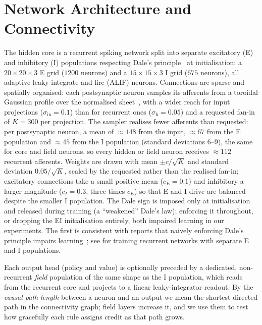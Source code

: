 \documentclass[10pt,twocolumn]{article}
\begin{document}
\clearpage
\onecolumn
\appendix

\section{Network Architecture and Connectivity}
\label{app:arch}
The hidden core is a recurrent spiking network split into separate excitatory
(E) and inhibitory (I) populations respecting Dale's
principle~\citep{dale1935pharmacology,vanVreeswijk1996Chaos} at initialisation:
a $20\times20\times3$ E grid ($1200$ neurons) and a $15\times15\times3$ I grid
($675$ neurons), all adaptive leaky integrate-and-fire (ALIF) neurons.
Connections are sparse and spatially organised: each postsynaptic neuron samples
its afferents from a toroidal Gaussian profile over the normalised
sheet~\citep{Spreizer2019Toroidal}, with a wider reach for input projections
($\sigma_{\mathrm{in}}=0.1$) than for recurrent ones ($\sigma_{\mathrm{h}}=0.05$)
and a requested fan-in of $K=300$ per projection. The sampler realises fewer
afferents than requested: per postsynaptic neuron, a mean of $\approx148$ from the
input, $\approx67$ from the E population and $\approx45$ from the I population
(standard deviations $6$--$9$), the same for core and field neurons, so every
hidden or field neuron receives $\approx112$ recurrent afferents. Weights are drawn
with mean $\pm c/\sqrt{K}$ and standard deviation $0.05/\sqrt{K}$, scaled by the
requested rather than the realised fan-in;
excitatory connections take a small positive mean ($c_E=0.1$) and inhibitory a
larger magnitude ($c_I=0.3$, three times $c_E$) so that E and I drive are balanced
despite the smaller I population. The Dale sign is imposed only at initialisation and
released during training (a ``weakened'' Dale's law); enforcing it throughout,
or dropping the EI initialisation entirely, both impaired learning in our
experiments. The first is consistent with reports that naively enforcing
Dale's principle impairs learning~\citep{Cornford2021DaleANN}; see
\citet{Song2016DaleEI} for training recurrent networks with separate E and I
populations.

Each output head (policy and value) is optionally preceded by a dedicated,
non-recurrent \emph{field} population of the same shape as the I population,
which reads from the recurrent core and projects to a linear leaky-integrator
readout. By the \emph{causal path length} between a neuron and an output we mean
the shortest directed path in the connectivity graph; field layers increase it,
and we use them to test how gracefully each rule assigns credit as that path
grows.
\end{document}
